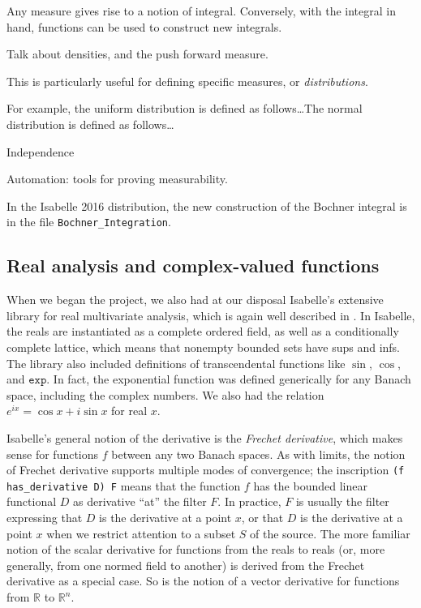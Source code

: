 \documentclass{svjour3}
\newcommand{\todo}[1]{{\color{red}#1}}
\newcommand{\RR}{\mathbb{R}}
\newcommand{\fn}[1]{\mathtt{#1}} %
\begin{document}
Any measure gives rise to a notion of integral. Conversely, with the integral in hand, functions can be used to construct new integrals.

\todo{Talk about densities, and the push forward measure.}

This is particularly useful for defining specific measures, or \emph{distributions}. 

\todo{For example, the uniform distribution is defined as follows\ldots The normal distribution is defined as follows\ldots}

\todo{Independence}

\todo{Automation: tools for proving measurability.}

In the Isabelle 2016 distribution, the new construction of the Bochner integral is in the file \verb=Bochner_Integration=. 

\subsection{Real analysis and complex-valued functions}
\label{subsect:real:analysis:section}

When we began the project, we also had at our disposal Isabelle's extensive library for real multivariate analysis, which is again well described in \cite{hoelzl:et:al:13}. In Isabelle, the reals are instantiated as a complete ordered field, as well as a conditionally complete lattice, which means that nonempty bounded sets have sups and infs. The library also included definitions of transcendental functions like $\sin$, $\cos$, and $\fn{exp}$. In fact, the exponential function was defined generically for any Banach space, including the complex numbers. We also had the relation $e^{i x} = \cos x + i \sin x$ for real $x$.

Isabelle's general notion of the derivative is the \emph{Frechet derivative}, which makes sense for functions $f$ between any two Banach spaces. As with limits, the notion of Frechet derivative supports multiple modes of convergence; the inscription \verb=(f has_derivative D) F= means that the function $f$ has the bounded linear functional $D$ as derivative ``at'' the filter $F$. In practice, $F$ is usually the filter expressing that $D$ is the derivative at a point $x$, or that $D$ is the derivative at a point $x$ when we restrict attention to a subset $S$ of the source. The more familiar notion of the scalar derivative for functions from the reals to reals (or, more generally, from one normed field to another) is derived from the Frechet derivative as a special case. So is the notion of a vector derivative for functions from $\RR$ to $\RR^n$.
\end{document}
